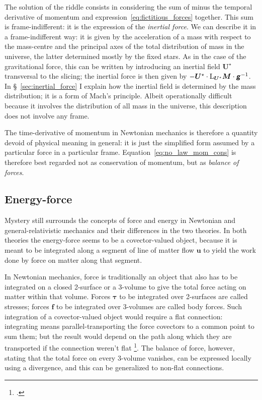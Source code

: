 \documentclass[\ifafour a4paper,12pt,\else a5paper,10pt,\fi%
onecolumn,oneside,article,%
british%
]{memoir}
\theoremstyle{remark}
\theoremstyle{innote}
\newcommand*{\mathte}[1]{\textbf{\textit{\textsf{#1}}}}
\newcommand*{\citep}{\footcites}
\renewcommand*{\|}[1][]{\nonscript\,#1\vert\nonscript\;\mathopen{}}
\newcommand*{\sect}{\S}%
\newcommand*{\Li}{\mathrm{L}}
\newcommand*{\yrr}{M}
\newcommand*{\yr}{\bm{\yrr}}
\newcommand*{\ycc}{u}
\newcommand*{\yc}{\bm{\ycc}}
\newcommand*{\yTT}{\tau}
\newcommand*{\yT}{\bm{\yTT}}
\newcommand*{\ybb}{f}
\newcommand*{\yb}{\bm{\ybb}}
\newcommand*{\yFF}{U}
\newcommand*{\yF}{\bm{\yFF}}
\newcommand*{\yFi}{\yF^{\mathord{\star}}}
\newcommand*{\ygg}{g}
\newcommand*{\yg}{\mathte{\ygg}}
\begin{document}
The solution of the riddle consists in considering the sum of minus the
temporal derivative of momentum and expression~\eqref{eq:fictitious_forces}
together. This sum is frame-indifferent: it is the expression of the
\emph{inertial force}. We can describe it in a frame-indifferent way: it is
given by the acceleration of a mass with respect to the mass-centre and the
principal axes of the total distribution of mass in the universe, the
latter determined mostly by the fixed stars. As in the case of the
gravitational force, this can be written by introducing an inertial field
$\yFi$ transversal to the slicing; the inertial force is then given by
$-\yFi \cdot \Li_{\yFi}\yr \cdot \yg^{-1}$. In
\sect~\ref{sec:inertial_force} I explain how the inertial field is
determined by the mass distribution; it is a form of Mach's principle.
Albeit operationally difficult because it involves the distribution of all
mass in the universe, this description does not involve any frame.

The time-derivative of momentum in Newtonian mechanics is therefore a
quantity devoid of physical meaning in general: it is just the simplified
form assumed by a particular force in a particular frame.
Equation~\eqref{eq:no_law_mom_cons} is therefore best regarded not as
conservation of momentum, but as \emph{balance of forces}.
\fi

\subsection{Energy-force}
\label{sec:force_balance_newton}

Mystery still surrounds the concepts of force and energy in Newtonian and
general-relativistic mechanics and their differences in the two theories.
In both theories the energy-force seems to be a covector-valued object,
because it is meant to be integrated along a segment of line of matter flow
$\yc$ to yield the work done by force on matter along that segment.

In Newtonian mechanics, force is traditionally an object that also has to
be integrated on a closed 2-surface or a 3-volume to give the total force
acting on matter within that volume. Forces $\yT$ to be integrated over
2-surfaces are called stresses; forces $\yb$ to be integrated over
3-volumes are called body forces. Such integration of a covector-valued
object would require a flat connection: integrating means
parallel-transporting the force covectors to a common point to sum them;
but the result would depend on the path along which they are transported if
the connection weren't flat \citep[\sect~238]{truesdelletal1960}. The
balance of force, however, stating that the total force on every 3-volume
vanishes, can be expressed locally using a divergence, and this can be
generalized to non-flat connections.
\end{document}
